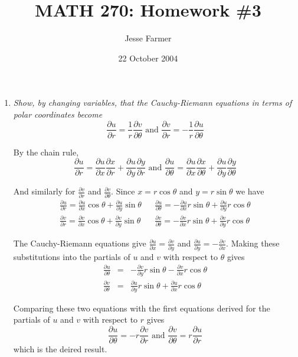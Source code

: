 \documentclass[letterpaper, 11pt]{article}
\title{MATH 270: Homework \#3}
\author{Jesse Farmer}
\date{22 October 2004}
\begin{document}
\maketitle
\begin{enumerate}

\item \emph{Show, by changing variables, that the Cauchy-Riemann equations in terms of polar coordinates become $$ \frac{\partial u}{\partial r} = \frac{1}{r}\frac{\partial v}{\partial \theta} \text{ and } \frac{\partial v}{\partial r} = -\frac{1}{r} \frac{\partial u}{\partial \theta}$$}

By the chain rule,
\[
\frac{\partial u}{\partial r} = \frac{\partial u}{\partial x}\frac{\partial x}{\partial r} + \frac{\partial u}{\partial y}\frac{\partial y}{\partial r} \mbox{ and } \frac{\partial u}{\partial \theta} = \frac{\partial u}{\partial x}\frac{\partial x}{\partial \theta} + \frac{\partial u}{\partial y}\frac{\partial y}{\partial \theta}
\]

And similarly for $\frac{\partial v}{\partial r}$ and $\frac{\partial v}{\partial \theta}$.  Since $x = r\cos\theta$ and $y = r\sin\theta$ we have
\begin{eqnarray*}
\frac{\partial u}{\partial r} = \frac{\partial u}{\partial x}\cos\theta + \frac{\partial u}{\partial y}\sin\theta && \frac{\partial u}{\partial \theta} = -\frac{\partial u}{\partial x}r\sin\theta + \frac{\partial u}{\partial y}r\cos\theta \\
 \frac{\partial v}{\partial r} = \frac{\partial v}{\partial x}\cos\theta + \frac{\partial v}{\partial y}\sin\theta && \frac{\partial v}{\partial \theta} = -\frac{\partial v}{\partial x}r\sin\theta + \frac{\partial v}{\partial y}r\cos\theta
\end{eqnarray*}

The Cauchy-Riemann equations give $\frac{\partial u}{\partial x} = \frac{\partial v}{\partial y}$ and $\frac{\partial u}{\partial y} = -\frac{\partial v}{\partial x}$.  Making these substitutions into the partials of $u$ and $v$ with respect to $\theta$ gives
\begin{eqnarray*}
\frac{\partial u}{\partial \theta} &=& -\frac{\partial v}{\partial y}r\sin\theta - \frac{\partial v}{\partial x}r\cos\theta \\ 
\frac{\partial v}{\partial \theta} &=& \frac{\partial u}{\partial y}r\sin\theta + \frac{\partial u}{\partial x}r\cos\theta
\end{eqnarray*}

Comparing these two equations with the first equations derived for the partials of $u$ and $v$ with respect to $r$ gives $$\frac{\partial u}{\partial \theta} = -r \frac{\partial v}{\partial r} \mbox{ and } \frac{\partial v}{\partial \theta} = r\frac{\partial u}{\partial r}$$ which is the deired result.


\end{enumerate}
\end{document}
